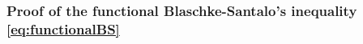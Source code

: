\documentclass[11pt]{article}
\newcommand{\1}{[1]}
\begin{document}






\subsubsection*{Proof of  the functional Blaschke-Santalo's inequality \eqref{eq:functionalBS}}
\end{document}
